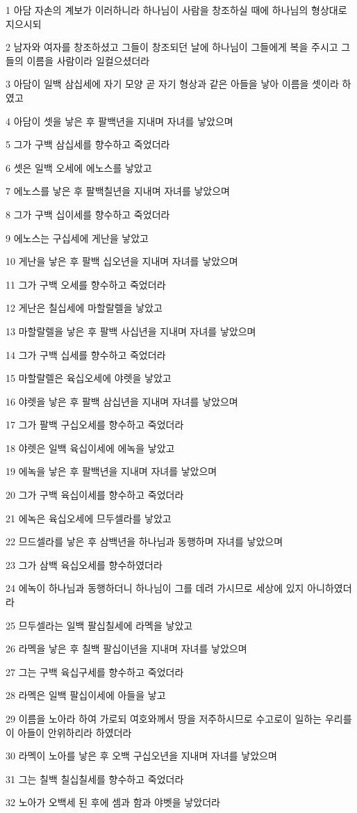 \par 1 아담 자손의 계보가 이러하니라 하나님이 사람을 창조하실 때에 하나님의 형상대로 지으시되
\par 2 남자와 여자를 창조하셨고 그들이 창조되던 날에 하나님이 그들에게 복을 주시고 그들의 이름을 사람이라 일컬으셨더라
\par 3 아담이 일백 삼십세에 자기 모양 곧 자기 형상과 같은 아들을 낳아 이름을 셋이라 하였고
\par 4 아담이 셋을 낳은 후 팔백년을 지내며 자녀를 낳았으며
\par 5 그가 구백 삼십세를 향수하고 죽었더라
\par 6 셋은 일백 오세에 에노스를 낳았고
\par 7 에노스를 낳은 후 팔백칠년을 지내며 자녀를 낳았으며
\par 8 그가 구백 십이세를 향수하고 죽었더라
\par 9 에노스는 구십세에 게난을 낳았고
\par 10 게난을 낳은 후 팔백 십오년을 지내며 자녀를 낳았으며
\par 11 그가 구백 오세를 향수하고 죽었더라
\par 12 게난은 칠십세에 마할랄렐을 낳았고
\par 13 마할랄렐을 낳은 후 팔백 사십년을 지내며 자녀를 낳았으며
\par 14 그가 구백 십세를 향수하고 죽었더라
\par 15 마할랄렐은 육십오세에 야렛을 낳았고
\par 16 야렛을 낳은 후 팔백 삼십년을 지내며 자녀를 낳았으며
\par 17 그가 팔백 구십오세를 향수하고 죽었더라
\par 18 야렛은 일백 육십이세에 에녹을 낳았고
\par 19 에녹을 낳은 후 팔백년을 지내며 자녀를 낳았으며
\par 20 그가 구백 육십이세를 향수하고 죽었더라
\par 21 에녹은 육십오세에 므두셀라를 낳았고
\par 22 므드셀라를 낳은 후 삼백년을 하나님과 동행하며 자녀를 낳았으며
\par 23 그가 삼백 육십오세를 향수하였더라
\par 24 에녹이 하나님과 동행하더니 하나님이 그를 데려 가시므로 세상에 있지 아니하였더라
\par 25 므두셀라는 일백 팔십칠세에 라멕을 낳았고
\par 26 라멕을 낳은 후 칠백 팔십이년을 지내며 자녀를 낳았으며
\par 27 그는 구백 육십구세를 향수하고 죽었더라
\par 28 라멕은 일백 팔십이세에 아들을 낳고
\par 29 이름을 노아라 하여 가로되 여호와께서 땅을 저주하시므로 수고로이 일하는 우리를 이 아들이 안위하리라 하였더라
\par 30 라멕이 노아를 낳은 후 오백 구십오년을 지내며 자녀를 낳았으며
\par 31 그는 칠백 칠십칠세를 향수하고 죽었더라
\par 32 노아가 오백세 된 후에 셈과 함과 야벳을 낳았더라

